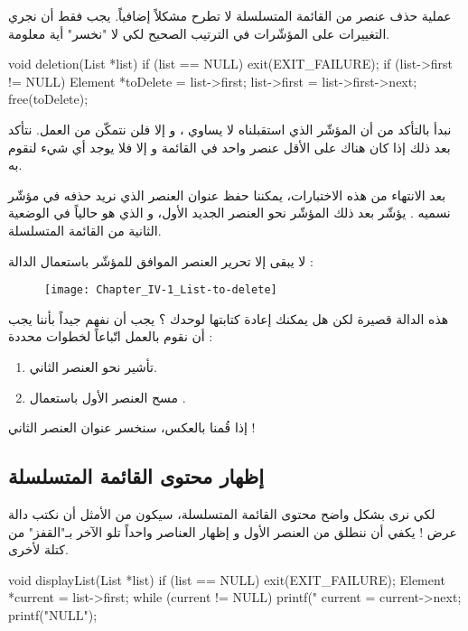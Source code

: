 عملية حذف عنصر من القائمة المتسلسلة لا تطرح مشكلاً إضافياً. يجب فقط أن نجري التغييرات على المؤشّرات في الترتيب الصحيح لكي لا "نخسر" أية معلومة.

\begin{Csource}
void deletion(List *list)
{
	if (list == NULL)
	{
		exit(EXIT_FAILURE);
	}
	if (list->first != NULL)
	{
		Element *toDelete = list->first;
		list->first = list->first->next;
		free(toDelete);
	}
}
\end{Csource}

نبدأ بالتأكد من أن المؤشّر الذي استقبلناه لا يساوي
،
و إلا فلن نتمكّن من العمل. نتأكد بعد ذلك إذا كان هناك على الأقل عنصر واحد في القائمة و إلا فلا يوجد أي شيء لنقوم به.

بعد الانتهاء من هذه الاختبارات، يمكننا حفظ عنوان العنصر الذي نريد حذفه في مؤشّر نسميه
.
يؤشّر بعد ذلك المؤشّر
نحو العنصر الجديد الأول، و الذي هو حالياً في الوضعية الثانية من القائمة المتسلسلة.

لا يبقى إلا تحرير العنصر الموافق للمؤشّر 
باستعمال الدالة
 :

\begin{figure}[H]
	\centering
	\texttt{[image: Chapter\_IV-1\_List-to-delete]}
\end{figure}

هذه الدالة قصيرة لكن هل يمكنك إعادة كتابتها لوحدك ؟ يجب أن نفهم جيداً بأننا يجب أن نقوم بالعمل اتّباعاً لخطوات محددة :

\begin{enumerate}
	\item تأشير
	نحو العنصر الثاني.
	\item مسح العنصر الأول باستعمال 
	.
\end{enumerate}

إذا قُمنا بالعكس، سنخسر عنوان العنصر الثاني !

\subsection{إظهار محتوى القائمة المتسلسلة}

لكي نرى بشكل واضح محتوى القائمة المتسلسلة، سيكون من الأمثل أن نكتب دالة عرض ! يكفي أن ننطلق من العنصر الأول و إظهار العناصر واحداً تلو الآخر بـ"القفز" من كتلة لأخرى.

\begin{Csource}
void displayList(List *list)
{
	if (list == NULL)
	{
		exit(EXIT_FAILURE);
	}
	Element *current = list->first;
	while (current != NULL)
	{
		printf("%
		current = current->next;
	}
	printf("NULL\n");
}
\end{Csource}

